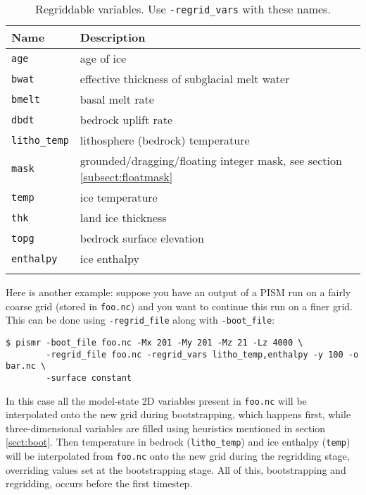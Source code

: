 \begin{table}[ht]
  \centering
  \caption{Regriddable variables.  Use \texttt{-regrid_vars} with these names.}\label{tab:regridvar}
  \begin{tabular}{ll}\toprule
    \textbf{Name} & \textbf{Description}\\ \midrule
    \texttt{age} & age of ice\\
    \texttt{bwat} & effective thickness of subglacial melt water \\
    \texttt{bmelt} & basal melt rate \\
    \texttt{dbdt} & bedrock uplift rate \\
    \texttt{litho_temp} & lithosphere (bedrock) temperature \\
    \texttt{mask} & grounded/dragging/floating integer mask, see section \ref{subsect:floatmask} \\
    \texttt{temp} & ice temperature \\
    \texttt{thk} & land ice thickness \\
    \texttt{topg} & bedrock surface elevation \\
    \texttt{enthalpy} & ice enthalpy\\
    \bottomrule
    \normalsize
  \end{tabular}
\end{table}

Here is another example: suppose you have an output of a PISM run on a fairly
coarse grid (stored in \texttt{foo.nc}) and you want to continue this run on a
finer grid. This can be done using \texttt{-regrid_file} along with
\texttt{-boot_file}:
\begin{verbatim}
$ pismr -boot_file foo.nc -Mx 201 -My 201 -Mz 21 -Lz 4000 \
        -regrid_file foo.nc -regrid_vars litho_temp,enthalpy -y 100 -o bar.nc \
        -surface constant
\end{verbatim}
In this case all the model-state 2D variables present in \texttt{foo.nc} will
be interpolated onto the new grid during bootstrapping, which happens first,
while three-dimensional variables are filled using heuristics mentioned in
section \ref{sect:boot}.  Then temperature in bedrock (\texttt{litho_temp}) and
ice enthalpy (\texttt{temp}) will be interpolated from \texttt{foo.nc} onto the
new grid during the regridding stage, overriding values set at the
bootstrapping stage.  All of this, bootstrapping and regridding, occurs before
the first timestep.


\newcommand\pid{\textsl{pid}s}

